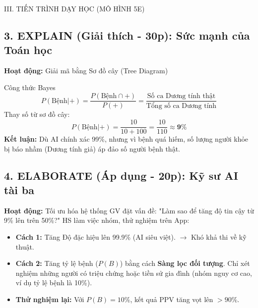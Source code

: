\documentclass[12pt,a4paper]{article}
\begin{document}
\begin{sectionbox}{III. TIẾN TRÌNH DẠY HỌC (MÔ HÌNH 5E)}
\subsection*{3. EXPLAIN (Giải thích - 30p): Sức mạnh của Toán học}
\textbf{Hoạt động:} Giải mã bằng Sơ đồ cây (Tree Diagram)
\begin{center}
\end{center}

\begin{mathbox}{Công thức Bayes}
$$ P(\text{Bệnh}|+) = \frac{P(\text{Bệnh} \cap +)}{P(+)} = \frac{\text{Số ca Dương tính thật}}{\text{Tổng số ca Dương tính}} $$
Thay số từ sơ đồ cây:
$$ P(\text{Bệnh}|+) = \frac{10}{10 + 100} = \frac{10}{110} \approx \mathbf{9\%} $$
\textbf{Kết luận:} Dù AI chính xác 99\%, nhưng vì bệnh quá hiếm, số lượng người khỏe bị báo nhầm (Dương tính giả) áp đảo số người bệnh thật.
\end{mathbox}

\subsection*{4. ELABORATE (Áp dụng - 20p): Kỹ sư AI tài ba}
\textbf{Hoạt động:} Tối ưu hóa hệ thống
GV đặt vấn đề: "Làm sao để tăng độ tin cậy từ 9\% lên trên 50\%?"
HS làm việc nhóm, thử nghiệm trên App:
\begin{itemize}
    \item \textbf{Cách 1:} Tăng Độ đặc hiệu lên 99.9\% (AI siêu việt). $\to$ Khó khả thi về kỹ thuật.
    \item \textbf{Cách 2:} Tăng tỷ lệ bệnh ($P(B)$) bằng cách \textbf{Sàng lọc đối tượng}. Chỉ xét nghiệm những người có triệu chứng hoặc tiền sử gia đình (nhóm nguy cơ cao, ví dụ tỷ lệ bệnh là 10\%).
    \item \textbf{Thử nghiệm lại:} Với $P(B)=10\%$, kết quả PPV tăng vọt lên $>90\%$.
\end{itemize}


\end{sectionbox}
\end{document}
